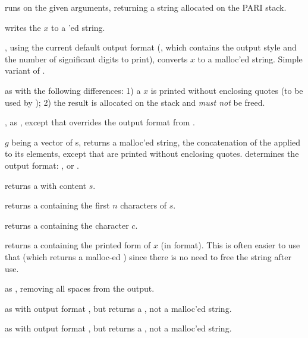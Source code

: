  runs 
on the given arguments, returning a string allocated on the PARI stack.

 writes the  $x$ to a 'ed
string.

, using the current default output format
(, which contains the output style and the number of
significant digits to print), converts $x$ to a malloc'ed string. Simple
variant of .

 as  with the following
differences: 1) a  $x$ is printed without enclosing quotes
(to be used by ); 2) the result is allocated on the stack
and \emph{must not} be freed.

, as , except that
 overrides the output format from .

 $g$ being a vector of s,
returns a malloc'ed string, the concatenation of the  applied
to its elements, except that  are printed without enclosing quotes.
 determines the output format: , 
or .


 returns a  with content $s$.

returns a  containing the first $n$ characters of $s$.

 returns a  containing the character
$c$.

 returns a  containing the printed
form of $x$ (in  format). This is often easier to use that
 (which returns a malloc-ed ) since there is no need
to free the string after use.

 as , removing all
spaces from the output.

 as  with output format ,
but returns a , not a malloc'ed string.

 as  with output format ,
but returns a , not a malloc'ed string.

